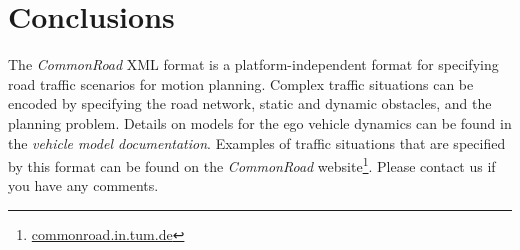 

\section{Conclusions}

The \textit{CommonRoad} XML format is a platform-independent format for specifying road traffic scenarios for motion planning. Complex traffic situations can be encoded by specifying the road network, static and dynamic obstacles, and the planning problem. Details on models for the ego vehicle dynamics can be found in the \textit{vehicle model documentation}. Examples of traffic situations that are specified by this format can be found on the \textit{CommonRoad} website\footnote{\href{https://commonroad.in.tum.de}{commonroad.in.tum.de}}. Please contact us if you have any comments.
